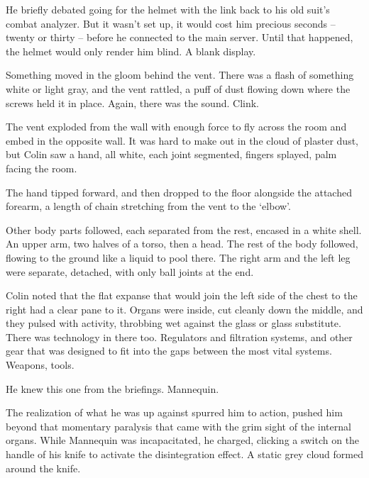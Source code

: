 He briefly debated going for the helmet with the link back to his old suit's combat analyzer.  But it wasn't set up, it would cost him precious seconds – twenty or thirty – before he connected to the main server.  Until that happened, the helmet would only render him blind.  A blank display.



Something moved in the gloom behind the vent.  There was a flash of something white or light gray, and the vent rattled, a puff of dust flowing down where the screws held it in place.  Again, there was the sound.  Clink.



The vent exploded from the wall with enough force to fly across the room and embed in the opposite wall. It was hard to make out in the cloud of plaster dust, but Colin saw a hand, all white, each joint segmented, fingers splayed, palm facing the room.



The hand tipped forward, and then dropped to the floor alongside the attached forearm, a length of chain stretching from the vent to the `elbow'.



Other body parts followed, each separated from the rest, encased in a white shell.  An upper arm, two halves of a torso, then a head.  The rest of the body followed, flowing to the ground like a liquid to pool there.  The right arm and the left leg were separate, detached, with only ball joints at the end.



Colin noted that the flat expanse that would join the left side of the chest to the right had a clear pane to it.  Organs were inside, cut cleanly down the middle, and they pulsed with activity, throbbing wet against the glass or glass substitute.  There was technology in there too.  Regulators and filtration systems, and other gear that was designed to fit into the gaps between the most vital systems.  Weapons, tools.



He knew this one from the briefings.  Mannequin.



The realization of what he was up against spurred him to action, pushed him beyond that momentary paralysis that came with the grim sight of the internal organs.  While Mannequin was incapacitated, he charged, clicking a switch on the handle of his knife to activate the disintegration effect.  A static grey cloud formed around the knife.




